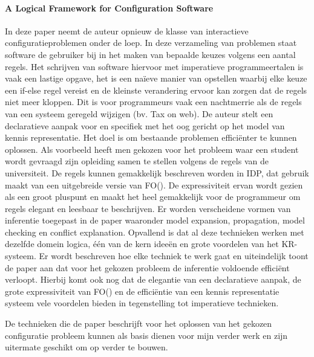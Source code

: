 \paragraph{A Logical Framework for Configuration Software \cite{vlaeminck2009logical}}
In deze paper neemt de auteur opnieuw de klasse van interactieve configuratieproblemen onder de loep. In deze verzameling van problemen staat software de gebruiker bij in het maken van bepaalde keuzes volgens een aantal regels. Het schrijven van software hiervoor met imperatieve programmeertalen is vaak een lastige opgave, het is een na\"{i}eve manier van opstellen waarbij elke keuze een if-else regel vereist en de kleinste verandering ervoor kan zorgen dat de regels niet meer kloppen. Dit is voor programmeurs vaak een nachtmerrie als de regels van een systeem geregeld wijzigen (bv. Tax on web). De auteur stelt een declaratieve aanpak voor en specifiek met het oog gericht op het model van kennis representatie. Het doel is om bestaande problemen effici\"{e}nter te kunnen oplossen. Als voorbeeld heeft men gekozen voor het probleem waar een student wordt gevraagd zijn opleiding samen te stellen volgens de regels van de universiteit. De regels kunnen gemakkelijk beschreven worden in IDP, dat gebruik maakt van een uitgebreide versie van FO(\textperiodcentered). De expressiviteit ervan wordt gezien als een groot pluspunt en maakt het heel gemakkelijk voor de programmeur om regels elegant en leesbaar te beschrijven. Er worden verscheidene vormen van inferentie toegepast in de paper waaronder model expansion, propagation, model checking en conflict explanation. Opvallend is dat al deze technieken werken met dezelfde domein logica, \'{e}\'{e}n van de kern idee\"{e}n en grote voordelen van het KR-systeem. Er wordt beschreven hoe elke techniek te werk gaat en uiteindelijk toont de paper aan dat voor het gekozen probleem de inferentie voldoende effici\"{e}nt verloopt. Hierbij komt ook nog dat de elegantie van een declaratieve aanpak, de grote expressiviteit van FO(\textperiodcentered) en de effici\"{e}ntie van een kennis representatie systeem vele voordelen bieden in tegenstelling tot imperatieve technieken. 

De technieken die de paper beschrijft voor het oplossen van het gekozen configuratie probleem kunnen als basis dienen voor mijn verder werk en zijn uitermate geschikt om op verder te bouwen. 

